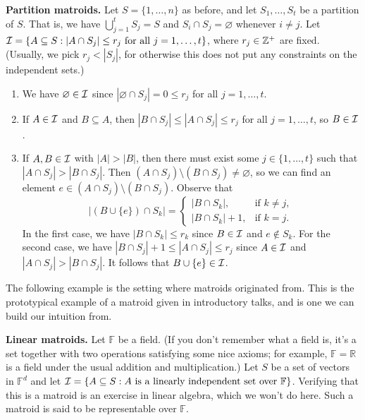 {\bf Partition matroids.} Let $S = \{1, \dots, n\}$ as before, and 
let $S_1, \dots, S_t$ be a partition of $S$. That is, we have 
$\bigcup_{j=1}^t S_j = S$ and $S_i \cap S_j = \varnothing$ whenever 
$i \neq j$. Let ${\cal I} = \{A \subseteq S : |A \cap S_j| \leq r_j 
\text{ for all } j = 1, \dots, t\}$, where $r_j \in \mathbb{Z}^+$ are fixed. 
(Usually, we pick $r_j < |S_j|$, for otherwise this does not put 
any constraints on the independent sets.)
\begin{enumerate}[(1)]
    \item We have $\varnothing \in {\cal I}$ since $|\varnothing \cap S_j| =
    0 \leq r_j$ for all $j = 1, \dots, t$. 
    \item If $A \in {\cal I}$ and $B \subseteq A$, then $|B \cap S_j| 
    \leq |A \cap S_j| \leq r_j$ for all $j = 1, \dots, t$, so $B \in {\cal I}$.
    \item If $A, B \in {\cal I}$ with $|A| > |B|$, then there must exist 
    some $j \in \{1, \dots, t\}$ such that $|A \cap S_j| > |B \cap S_j|$. 
    Then $(A \cap S_j) \setminus (B \cap S_j) \neq \varnothing$, so 
    we can find an element $e \in (A \cap S_j) \setminus (B \cap S_j)$. 
    Observe that 
    \[ |(B \cup \{e\}) \cap S_k| = \begin{cases}
        |B \cap S_k|, & \text{if } k \neq j, \\ 
        |B \cap S_k| + 1, & \text{if } k = j. 
    \end{cases} \] 
    In the first case, we have $|B \cap S_k| \leq r_k$ since $B \in {\cal I}$
    and $e \notin S_k$. For the second case, we have $|B \cap S_j| + 1 
    \leq |A \cap S_j| \leq r_j$ since $A \in {\cal I}$ and 
    $|A \cap S_j| > |B \cap S_j|$. It follows that 
    $B \cup \{e\} \in {\cal I}$. 
\end{enumerate}

The following example is the setting where matroids originated from. 
This is the prototypical example of a matroid given in introductory
talks, and is one we can build our intuition from. 

{\bf Linear matroids.} Let $\mathbb{F}$ be a field. (If you don't remember 
what a field is, it's a set together with two operations satisfying 
some nice axioms; for example, $\mathbb{F} = \mathbb{R}$ is a field under 
the usual addition and multiplication.) 
Let $S$ be a set of vectors in $\mathbb{F}^d$ and let 
${\cal I} = \{A \subseteq S : A \text{ is a linearly independent set over }
\mathbb{F}\}$. Verifying that this is a matroid is an exercise in 
linear algebra, which we won't do here. Such a matroid is said to be 
representable over $\mathbb{F}$.


